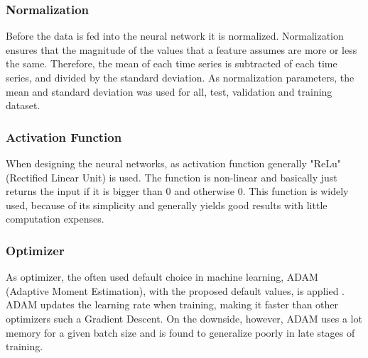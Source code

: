 \subsubsection{Normalization}
Before the data is fed into the neural network it is normalized. Normalization ensures that the magnitude of the values that a feature assumes are more or less the same. Therefore, the mean of each time series is subtracted of each time series, and divided by the standard deviation. As normalization parameters, the mean and standard deviation was used for all, test, validation and training dataset.  

\subsubsection{Activation Function}
When designing the neural networks, as activation function generally "ReLu" (Rectified Linear Unit) is used. The function is non-linear and basically just returns the input if it is bigger than 0 and otherwise 0. This function is widely used, because of its simplicity and generally yields good results with little computation expenses.  

\subsubsection{Optimizer}
As optimizer, the often used default choice in machine learning, ADAM (Adaptive Moment Estimation), with the proposed default values, is applied \parencite{Katanforoosh2019}. ADAM updates the learning rate when training, making it faster than other optimizers such a Gradient Descent. On the downside, however, ADAM uses a lot memory for a given batch size and is found to generalize poorly in late stages of training.

